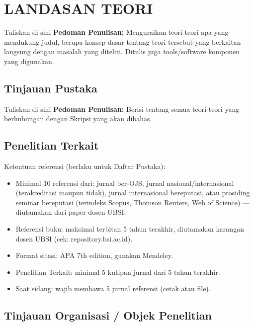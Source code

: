 \chapter{LANDASAN TEORI}


Tuliskan di sini \textbf{Pedoman Penulisan:} Menguraikan teori-teori apa yang mendukung judul, berupa konsep dasar tentang teori tersebut yang berkaitan langsung dengan masalah yang diteliti. Ditulis juga tools/software komponen yang digunakan.


\section{Tinjauan Pustaka}


Tuliskan di sini \textbf{Pedoman Penulisan:} Berisi tentang semua teori-teori yang berhubungan dengan Skripsi yang akan dibahas.


\section{Penelitian Terkait}

Ketentuan referensi (berlaku untuk Daftar Pustaka):
\begin{itemize}
    \item Minimal 10 referensi dari: jurnal ber-OJS, jurnal nasional/internasional (terakreditasi maupun tidak), jurnal internasional bereputasi, atau prosiding seminar bereputasi (terindeks Scopus, Thomson Reuters, Web of Science) --- diutamakan dari paper dosen UBSI.
    \item Referensi buku: maksimal terbitan 5 tahun terakhir, diutamakan karangan dosen UBSI (cek: repository.bsi.ac.id).
    \item Format sitasi: APA 7th edition, gunakan Mendeley.
    \item Penelitian Terkait: minimal 5 kutipan jurnal dari 5 tahun terakhir.
    \item Saat sidang: wajib membawa 5 jurnal referensi (cetak atau file).
\end{itemize}


\section{Tinjauan Organisasi / Objek Penelitian}
